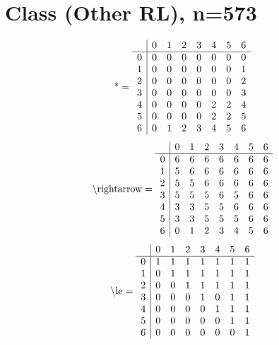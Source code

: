 \documentclass[11pt]{article}
\begin{document}
\section{Class (Other RL), n=573}
\[\text{*} = 
\begin{array}{r | r r r r r r r}
 & 0 & 1 & 2 & 3 & 4 & 5 & 6 \\ \hline
0 & 0 & 0 & 0 & 0 & 0 & 0 & 0 \\
1 & 0 & 0 & 0 & 0 & 0 & 0 & 1 \\
2 & 0 & 0 & 0 & 0 & 0 & 0 & 2 \\
3 & 0 & 0 & 0 & 0 & 0 & 0 & 3 \\
4 & 0 & 0 & 0 & 0 & 2 & 2 & 4 \\
5 & 0 & 0 & 0 & 0 & 2 & 2 & 5 \\
6 & 0 & 1 & 2 & 3 & 4 & 5 & 6 \\
\end{array}
\]
\[\text{\textbackslash rightarrow} = 
\begin{array}{r | r r r r r r r}
 & 0 & 1 & 2 & 3 & 4 & 5 & 6 \\ \hline
0 & 6 & 6 & 6 & 6 & 6 & 6 & 6 \\
1 & 5 & 6 & 6 & 6 & 6 & 6 & 6 \\
2 & 5 & 5 & 6 & 6 & 6 & 6 & 6 \\
3 & 5 & 5 & 5 & 6 & 5 & 6 & 6 \\
4 & 3 & 3 & 5 & 5 & 6 & 6 & 6 \\
5 & 3 & 3 & 5 & 5 & 5 & 6 & 6 \\
6 & 0 & 1 & 2 & 3 & 4 & 5 & 6 \\
\end{array}
\]
\[\text{\textbackslash le} = 
\begin{array}{r | r r r r r r r}
 & 0 & 1 & 2 & 3 & 4 & 5 & 6 \\ \hline
0 & 1 & 1 & 1 & 1 & 1 & 1 & 1 \\
1 & 0 & 1 & 1 & 1 & 1 & 1 & 1 \\
2 & 0 & 0 & 1 & 1 & 1 & 1 & 1 \\
3 & 0 & 0 & 0 & 1 & 0 & 1 & 1 \\
4 & 0 & 0 & 0 & 0 & 1 & 1 & 1 \\
5 & 0 & 0 & 0 & 0 & 0 & 1 & 1 \\
6 & 0 & 0 & 0 & 0 & 0 & 0 & 1 \\
\end{array}
\]
\end{document}
